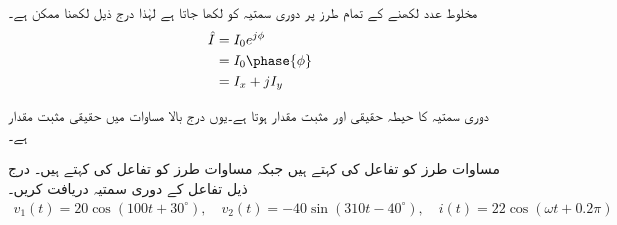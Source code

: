 مخلوط عدد لکھنے کے تمام طرز پر دوری سمتیہ کو لکھا جاتا ہے لہٰذا درج ذیل لکھنا ممکن ہے۔
\begin{gather}
\begin{aligned}\label{مساوات_بدلتا_تعددی_طرز}
\hat{I}&=I_0e^{j\phi}\\
 &=I_0\phase{\phi}\\
&=I_x+jI_y
\end{aligned}
\end{gather}

دوری سمتیہ کا حیطہ حقیقی اور مثبت مقدار ہوتا ہے۔یوں درج بالا مساوات میں  حقیقی مثبت مقدار ہے۔

مساوات  طرز کو تفاعل کی  کہتے ہیں جبکہ مساوات  طرز کو تفاعل کی  کہتے ہیں۔
درج ذیل تفاعل کے دوری سمتیہ دریافت کریں۔
\begin{align*}
v_1(t)=20 \cos (100t +30^{\circ}), \quad v_2(t)=-40 \sin(310t -40^{\circ}), \quad i(t)=22\cos(\omega t+0.2\pi)
\end{align*}

